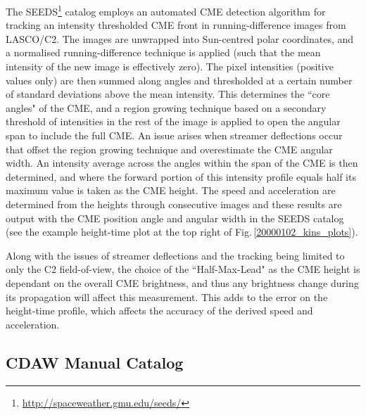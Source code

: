 \documentclass[referee,a4paper,12pt,traditabstract]{swsc}
\begin{document}
\begin{linenumbers}
The SEEDS\footnote{\href{http://spaceweather.gmu.edu/seeds/}{http://spaceweather.gmu.edu/seeds/}} catalog employs an automated CME detection algorithm for tracking an intensity thresholded CME front in running-difference images from LASCO/C2. The images are unwrapped into Sun-centred polar coordinates, and a normalised running-difference technique is applied (such that the mean intensity of the new image is effectively zero). The pixel intensities (positive values only) are then summed along angles and thresholded at a certain number of standard deviations above the mean intensity. This determines the ``core angles" of the CME, and a region growing technique based on a secondary threshold of intensities in the rest of the image is applied to open the angular span to include the full CME. An issue arises when streamer deflections occur that offset the region growing technique and overestimate the CME angular width. An intensity average across the angles within the span of the CME is then determined, and where the forward portion of this intensity profile equals half its maximum value is taken as the CME height. The speed and acceleration are determined from the heights through consecutive images and these results are output with the CME position angle and angular width in the SEEDS catalog (see the example height-time plot at the top right of Fig.\,\ref{20000102_kins_plots}).

Along with the issues of streamer deflections and the tracking being limited to only the C2 field-of-view, the choice of the ``Half-Max-Lead" as the CME height is dependant on the overall CME brightness, and thus any brightness change during its propagation will affect this measurement. This adds to the error on the height-time profile, which affects the accuracy of the derived speed and acceleration.

\subsection{CDAW Manual Catalog}


\end{linenumbers}
\end{document}
